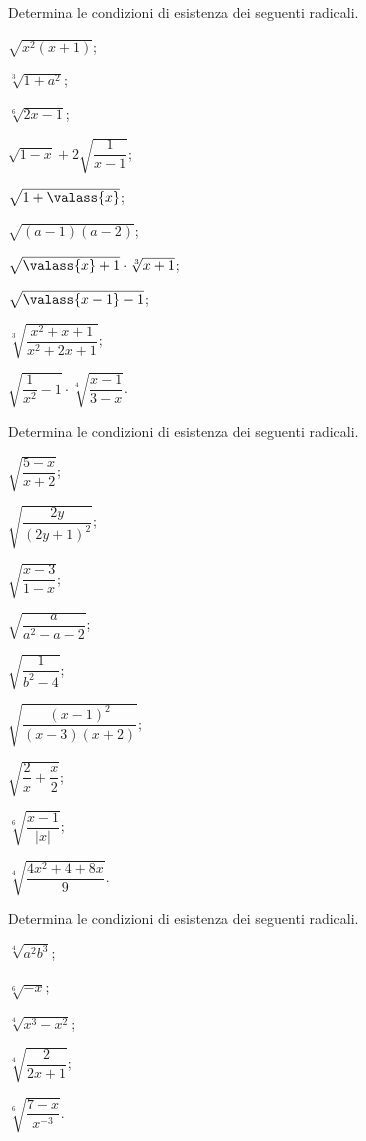 \begin{esercizio}[\Ast]
 \label{ese:2.12}
Determina le condizioni di esistenza dei seguenti radicali.
 \begin{multicols}{3}
 \begin{enumeratea}
 \item $\sqrt{x^2(x+1)}$;
 \item $\sqrt[3]{1+a^2}$;
 \item $\sqrt[6]{2x-1}$;
 \item $\sqrt{1-x}+2\sqrt{\dfrac 1{x-1}}$;
 \item $\sqrt{1+\valass{x}}$;
 \item $\sqrt{(a-1)(a-2)}$;
 \item $\sqrt{\valass{x}+1}\cdot \sqrt[3]{x+1}$;
 \item $\sqrt{\valass{x-1}-1}$;
 \item $\sqrt[3]{\dfrac{x^2+x+1}{x^2+2x+1}}$;
 \item $\sqrt{\dfrac 1{x^2}-1}\cdot \sqrt[4]{\dfrac{x-1}{3-x}}$.
 \end{enumeratea}
 \end{multicols}
\end{esercizio}

\begin{esercizio}[\Ast]
 \label{ese:2.13}
Determina le condizioni di esistenza dei seguenti radicali.
 \begin{multicols}{3}
 \begin{enumeratea}
 \item $\sqrt{\dfrac{5-x}{x+2}}$;
 \item $\sqrt{\dfrac{2y}{(2y+1)^2}}$;
 \item $\sqrt{\dfrac{x-3}{1-x}}$;
 \item $\sqrt{\dfrac a{a^2-a-2}}$;
 \item $\sqrt{\dfrac 1{b^2-4}}$;
 \item $\sqrt{\dfrac{(x-1)^2}{(x-3)(x+2)}}$;
 \item $\sqrt{\dfrac 2 x+\dfrac x 2}$;
 \item $\sqrt[6]{\dfrac{x-1}{\left|x\right|}}$;
 \item $\sqrt[4]{\dfrac{4x^2+4+8x} 9}$.
 \end{enumeratea}
 \end{multicols}
\end{esercizio}

\begin{esercizio}[\Ast]
Determina le condizioni di esistenza dei seguenti radicali.
 \label{ese:2.14}
 \begin{multicols}{3}
 \begin{enumeratea}
 \item $\sqrt[4]{a^2 b^3}$;
 \item $\sqrt[6]{-x}$;
 \item $\sqrt[4]{x^3 - x^2}$;
 \item $\sqrt[4]{\dfrac{2}{2x+1}}$;
 \item $\sqrt[6]{\dfrac{7-x}{x^{-3}}}$.
 \end{enumeratea}
 \end{multicols}
\end{esercizio}

